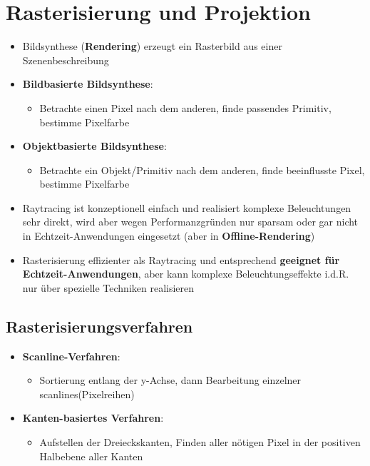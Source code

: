 \documentclass[10pt,a4paper]{article}
\begin{document}
	\newpage
	\section{Rasterisierung und Projektion}
	\label{rp:sec:rasterisierung_und_projektion}

	\begin{itemize}
		\item Bildsynthese (\textbf{Rendering}) erzeugt ein Rasterbild aus einer Szenenbeschreibung
		\item \textbf{Bildbasierte Bildsynthese}:
		\begin{itemize}
			\item Betrachte einen Pixel nach dem anderen, finde passendes Primitiv, bestimme Pixelfarbe
		\end{itemize}
		\item \textbf{Objektbasierte Bildsynthese}:
		\begin{itemize}
			\item Betrachte ein Objekt/Primitiv nach dem anderen, finde beeinflusste Pixel, bestimme Pixelfarbe
		\end{itemize}
		\item Raytracing ist konzeptionell einfach und realisiert komplexe Beleuchtungen sehr direkt, wird aber wegen Performanzgründen nur sparsam oder gar nicht in Echtzeit-Anwendungen eingesetzt (aber in \textbf{Offline-Rendering})
		\item Rasterisierung effizienter als Raytracing und entsprechend \textbf{geeignet für Echtzeit-Anwendungen}, aber kann komplexe Beleuchtungseffekte i.d.R. nur über spezielle Techniken realisieren
	\end{itemize}

	\subsection{Rasterisierungsverfahren}
	\label{rp:sub:rasterisierungsverfahren}
	
	\begin{itemize}
		\item \textbf{Scanline-Verfahren}:
		\begin{itemize}
			\item Sortierung entlang der y-Achse, dann Bearbeitung einzelner \glqq scanlines\grqq (Pixelreihen)
		\end{itemize}
		\item \textbf{Kanten-basiertes Verfahren}:
		\begin{itemize}
			\item Aufstellen der Dreieckskanten, Finden aller nötigen Pixel in der positiven Halbebene aller Kanten
		\end{itemize}
	\end{itemize}
\end{document}
